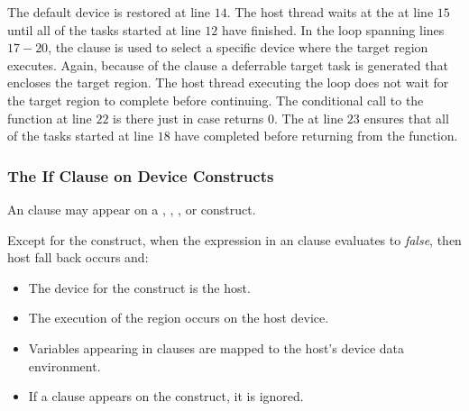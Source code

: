 The default device is restored at line $14$.  The host thread waits at the
 at line $15$ until all of the tasks started at line $12$ have
finished.  In the loop spanning lines $17-20$, the  clause is used
to select a specific device where the target region executes.  Again, because
of the  clause a deferrable target task is generated that encloses
the target region.  The host thread executing the loop does not wait for the
target region to complete before continuing.  The conditional call to the
function  at line $22$ is there just in case 
returns 0.  The  at line $23$ ensures that all of the tasks
started at line $18$ have completed before returning from the function.

\subsubsection{The If Clause on Device Constructs}
\label{ssec:06.if-clause}

An  clause
may appear on a , , ,
 or  construct.  

Except for the  construct, when the expression in an
 clause evaluates to \emph{false}, then host fall back occurs and: 
\begin{itemize} 
\item The device for the construct is the host.  
\item The execution of the region occurs on the host device.
\item Variables appearing in  clauses are mapped to the host's device data environment.
\item If a  clause appears on the construct, it is ignored. 
\end{itemize}

